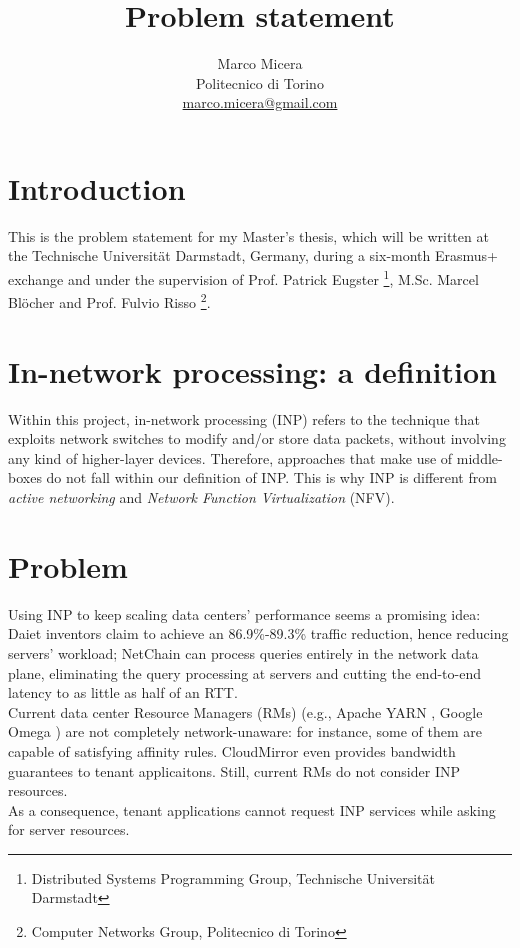 \documentclass[letterpaper,twocolumn,10pt]{article}
\begin{document}
\title{Problem statement}

\date{}

\author{
{   \rm Marco Micera}\\
    Politecnico di Torino\\
    \href{mailto:marco.micera@gmail.com}{marco.micera@gmail.com}
}
\maketitle

\section*{Introduction}
This is the problem statement for my Master's thesis, which will be written at the Technische Universit{\"a}t Darmstadt, Germany, during a six-month Erasmus+ exchange and under the supervision of Prof. Patrick Eugster \footnote[2]{\label{tuda} Distributed Systems Programming Group, Technische Universit{\"a}t Darmstadt}, M.Sc. Marcel Bl{\"o}cher  and Prof. Fulvio Risso \footnote[3]{\label{polito} Computer Networks Group, Politecnico di Torino}.

\section{In-network processing: a definition}
Within this project, in-network processing (INP) refers to the technique that exploits network switches to modify and/or store data packets, without involving any kind of higher-layer devices. Therefore, approaches that make use of middle-boxes do not fall within our definition of INP. This is why INP is different from \textit{active networking} and \textit{Network Function Virtualization} (NFV).

\section{Problem}
Using INP to keep scaling data centers' performance seems a promising idea: Daiet \cite{daiet} inventors claim to achieve an 86.9\%-89.3\% traffic reduction, hence reducing servers' workload; NetChain \cite{netchain} can process queries entirely in the network data plane, eliminating the query processing at servers and cutting the end-to-end latency to as little as half of an RTT.\\
Current data center Resource Managers (RMs) (e.g., Apache YARN \cite{yarn}, Google Omega \cite{omega}) are not completely network-unaware: for instance, some of them are capable of satisfying affinity rules. CloudMirror \cite{cloudmirror} even provides bandwidth guarantees to tenant applicaitons. Still, current RMs do not consider INP resources.\\
As a consequence, tenant applications cannot request INP services while asking for server resources.
\end{document}
